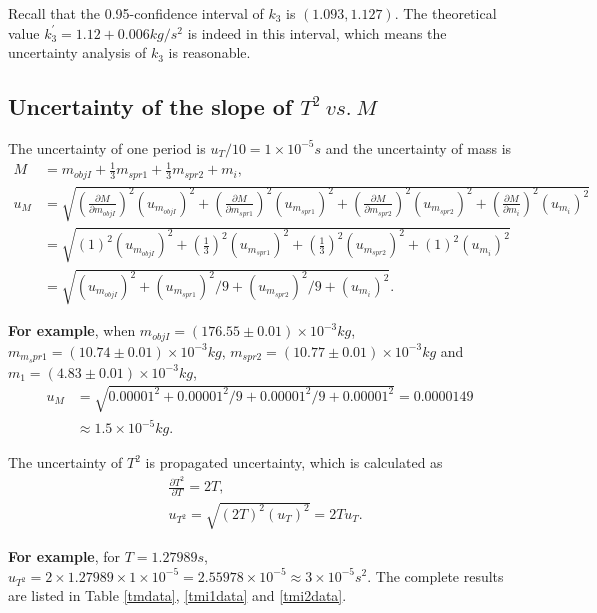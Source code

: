     Recall that the 0.95-confidence interval of $k_3$ is $(1.093,1.127)$. The theoretical value $k_3^{'}=1.12+0.006 kg/s^2$ is indeed in this interval, which means the uncertainty analysis of $k_3$ is reasonable.\\
    
\subsection{Uncertainty of the slope of $T^2\ vs.\ M$}
    The uncertainty of one period is $u_T/10=1\times10^{-5}s$ and the uncertainty of mass is
    \[
    \begin{split}
        M&=m_{objI}+\frac{1}{3}m_{spr1}+\frac{1}{3}m_{spr2}+m_i,\\
        u_M&=\sqrt{
         (\frac{\partial M}{\partial m_{objI}})^2(u_{m_{objI}})^2
        +(\frac{\partial M}{\partial m_{spr1}})^2(u_{m_{spr1}})^2
        +(\frac{\partial M}{\partial m_{spr2}})^2(u_{m_{spr2}})^2
        +(\frac{\partial M}{\partial m_i})^2(u_{m_i})^2
        }\\
        &=\sqrt{
         (1)^2(u_{m_{objI}})^2
        +(\frac{1}{3})^2(u_{m_{spr1}})^2
        +(\frac{1}{3})^2(u_{m_{spr2}})^2
        +(1)^2(u_{m_i})^2
        }\\
        &=\sqrt{(u_{m_{objI}})^2+(u_{m_{spr1}})^2/9+(u_{m_{spr2}})^2/9+(u_{m_i})^2}.
    \end{split}
    \]

    \textbf{For example}, when $m_{objI}=(176.55\pm0.01)\times10^{-3}kg$, $m_{m_spr1}=(10.74\pm0.01)\times10^{-3}kg$, $m_{spr2}=(10.77\pm0.01)\times10^{-3}kg$ and $m_1=(4.83\pm0.01)\times10^{-3}kg$,
    \[
    \begin{split}
        u_M&=\sqrt{0.00001^2+0.00001^2/9+0.00001^2/9+0.00001^2}=0.0000149\\
        &\approx 1.5\times10^{-5}kg.
    \end{split}
    \]

    The uncertainty of $T^2$ is propagated uncertainty, which is calculated as
    \[
    \begin{split}
        &\frac{\partial T^2}{\partial T}=2T,\\
        &u_{T^2}=\sqrt{(2T)^2(u_T)^2}=2Tu_T.
    \end{split}
    \]

    \textbf{For example}, for $T=1.27989s$, $u_{T^2}=2\times1.27989\times1\times10^{-5}=2.55978\times10^{-5}\approx3\times10^{-5}s^2$. The complete results are listed in Table \ref{tmdata}, \ref{tmi1data} and \ref{tmi2data}.


